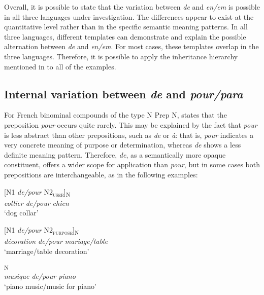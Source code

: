 \documentclass[output=paper]{langsci/langscibook}
\begin{document}
Overall, it is possible to state that the variation between \textit{de} and \textit{en/em} is possible in all three languages under investigation. The differences appear to exist at the quantitative level rather than in the specific semantic meaning patterns. In all three languages, different templates can demonstrate and explain the possible alternation between \textit{de} and \textit{en/em}. For most cases, these templates overlap in the three languages. Therefore, it is possible to apply the inheritance hierarchy mentioned in  to all of the examples.

 \subsection{Internal variation between \textit{de} and \textit{pour/para}}
 
 For French binominal compounds of the type N Prep N, \citet{Laumann:1998} states that the preposition \textit{pour} occurs quite rarely. This may be explained by the fact that \textit{pour} is less abstract than other prepositions, such as \textit{de} or \textit{à}: that is, \textit{pour }indicates a very concrete meaning of purpose or determination, whereas \textit{de} shows a less definite meaning pattern. Therefore, \textit{de}, as a semantically more opaque constituent, offers a wider scope for application than \textit{pour}, but in some cases both prepositions are interchangeable, as in the following examples:

\begin{exe}\ex\begin{minipage}[t]{0.4\textwidth}    %
[N1 \textit{de/pour} N2\textsubscript{\scshape user}]\textsubscript{N}\\
\textit{collier de/pour chien}\\
`dog collar'
\end{minipage}\hfill%
\begin{minipage}[t]{0.45\textwidth}
[N1 \textit{de/pour} N2\textsubscript{\scshape purpose}]\textsubscript{N}\\
\textit{décoration de/pour mariage/table}\\
`marriage/table decoration'
\end{minipage}
\end{exe}

\ea{}\textsubscript{N}\\
\textit{musique de/pour piano}\\
`piano music\slash music for piano'
\z
\end{document}
